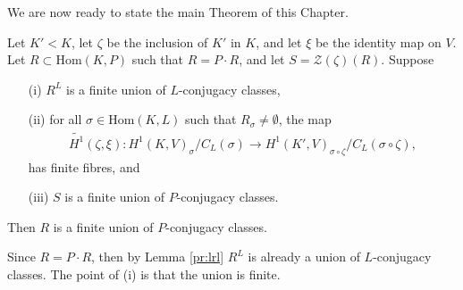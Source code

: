 We are now ready to state the main Theorem of this Chapter.

\begin{theorem}\label{main_thm} Let $K'<K$, let $\zeta$ be the inclusion of $K'$ in $K$, and let $\xi$ be the identity map on $V$. Let $R \subset \mathrm{Hom}(K, P)$ such that $R = P \cdot R$, and let $S = \mathcal{Z}(\zeta)(R)$. Suppose
	\begin{itemize}
		\item[(i)] $R^L$ is a finite union of $L$-conjugacy classes,
		\item[(ii)] for all $\sigma \in \mathrm{Hom}(K, L)$ such that $R_\sigma \neq \emptyset$, the map
			\begin{align*}
				\widetilde{H^1}(\zeta, \xi):H^1(K, V)_\sigma/C_L(\sigma) \rightarrow H^1(K', V)_{\sigma\circ\zeta}/C_L(\sigma\circ\zeta),
			\end{align*}
			has finite fibres, and
		\item[(iii)] $S$ is a finite union of $P$-conjugacy classes.
	\end{itemize}
	Then $R$ is a finite union of $P$-conjugacy classes.
\end{theorem}
\begin{remark}
	Since $R = P \cdot R$, then by Lemma \ref{pr:lrl} $R^L$ is already a union of $L$-conjugacy classes. The point of (i) is that the union is finite.
\end{remark}
